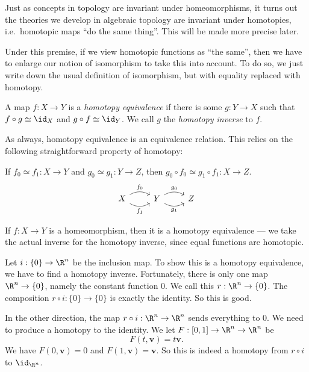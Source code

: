 \documentclass[a4paper]{article}
\theoremstyle{definition}
\begin{document}
Just as concepts in topology are invariant under homeomorphisms, it turns out the theories we develop in algebraic topology are invariant under homotopies, i.e.\ homotopic maps ``do the same thing''. This will be made more precise later.

Under this premise, if we view homotopic functions as ``the same'', then we have to enlarge our notion of isomorphism to take this into account. To do so, we just write down the usual definition of isomorphism, but with equality replaced with homotopy.

\begin{defi}
  A map $f: X \to Y$ is a \emph{homotopy equivalence} if there is some $g: Y \to X$ such that $f \circ g \simeq \id_X$ and $g \circ f \simeq \id_Y$. We call $g$ the \emph{homotopy inverse} to $f$.
\end{defi}
As always, homotopy equivalence is an equivalence relation. This relies on the following straightforward property of homotopy:

\begin{prop}
  If $f_0 \simeq f_1: X \to Y$ and $g_0 \simeq g_1: Y \to Z$, then $g_0 \circ f_0 \simeq g_1 \circ f_1: X \to Z$.
  \[
    \begin{tikzcd}
      X \ar[r, bend left, "f_0"] \ar[r, bend right, "f_1"'] & Y \ar[r, bend left, "g_0"] \ar[r, bend right, "g_1"'] & Z
    \end{tikzcd}
  \]
\end{prop}

\begin{eg}
  If $f: X \to Y$ is a homeomorphism, then it is a homotopy equivalence --- we take the actual inverse for the homotopy inverse, since equal functions are homotopic.
\end{eg}

\begin{eg}
  Let $i: \{0\} \to \R^n$ be the inclusion map. To show this is a homotopy equivalence, we have to find a homotopy inverse. Fortunately, there is only one map $\R^n \to \{0\}$, namely the constant function $0$. We call this $r: \R^n \to \{0\}$. The composition $r \circ i: \{0\} \to \{0\}$ is exactly the identity. So this is good.

  In the other direction, the map $r \circ i: \R^n \to \R^n$ sends everything to $0$. We need to produce a homotopy to the identity. We let $F: [0, 1] \to \R^n \to \R^n$ be
  \[
    F(t, \mathbf{v}) = t\mathbf{v}.
  \]
  We have $F(0, \mathbf{v}) = 0$ and $F(1, \mathbf{v}) = \mathbf{v}$. So this is indeed a homotopy from $r \circ i$ to $\id_{\R^n}$.
\end{eg}
\end{document}
